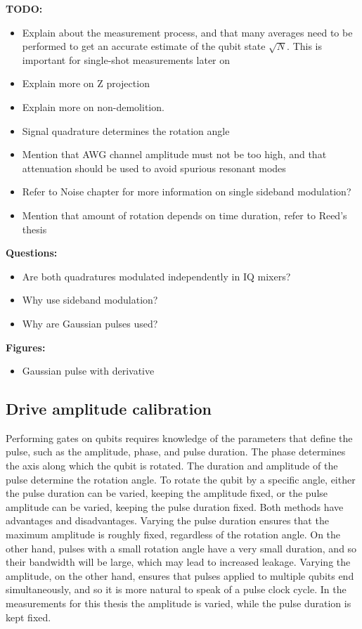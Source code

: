         \textbf{TODO:}
        \begin{itemize}
          \item Explain about the measurement process, and that many averages need to be performed to get an accurate estimate of the qubit state $\sqrt{N}$. This is important for single-shot measurements later on
          \item Explain more on Z projection
          \item Explain more on non-demolition.
          \item Signal quadrature determines the rotation angle
          \item Mention that AWG channel amplitude must not be too high, and that attenuation should be used to avoid spurious resonant modes
          \item Refer to Noise chapter for more information on single sideband modulation?
          \item Mention that amount of rotation depends on time duration, refer to Reed's thesis
        \end{itemize}

        \textbf{Questions:}
        \begin{itemize}
          \item Are both quadratures modulated independently in IQ mixers?
          \item Why use sideband modulation?
          \item Why are Gaussian pulses used?
         \end{itemize}

         \textbf{Figures:}
         \begin{itemize}
            \item Gaussian pulse with derivative
          \end{itemize}

      \subsection{Drive amplitude calibration}
        \label{ssec:Rabi}
        Performing gates on qubits requires knowledge of the parameters that define the pulse, such as the amplitude, phase, and pulse duration. The phase determines the axis along which the qubit is rotated. The duration and amplitude of the pulse determine the rotation angle. To rotate the qubit by a specific angle, either the pulse duration can be varied, keeping the amplitude fixed, or the pulse amplitude can be varied, keeping the pulse duration fixed. Both methods have advantages and disadvantages. Varying the pulse duration ensures that the maximum amplitude is roughly fixed, regardless of the rotation angle. On the other hand, pulses with a small rotation angle have a very small duration, and so their bandwidth will be large, which may lead to increased leakage. Varying the amplitude, on the other hand, ensures that pulses applied to multiple qubits end simultaneously, and so it is more natural to speak of a pulse clock cycle. In the measurements for this thesis the amplitude is varied, while the pulse duration is kept fixed.

